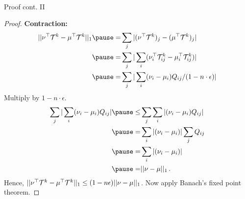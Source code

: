     \begin{frame}{Proof cont. II}
        \begin{proof}
    \textbf{Contraction:}
    \begin{equation}
        \begin{aligned}
            \norm{\nu^{\top} \mathcal{T}^k - \mu^{\top} \mathcal{T}^k}_1 
            \pause = &  \sum_j \abs{(\nu^\top \mathcal{T}^k)_j - (\mu^\top \mathcal{T}^k)_j} \\
            \pause = & \sum_j \abs{\sum_i (\nu^\top_i \mathcal{T}^k_{ij} - \mu^\top_i \mathcal{T}^k_{ij})} \\
            \pause = & \sum_j \abs{\sum_i(\nu_i - \mu_i) Q_{ij}/(1-n\cdot \epsilon)} 
       \end{aligned}
    \end{equation}
    \pause
    Multiply by $1-n\cdot\epsilon$.
    \begin{equation}
        \begin{aligned}
        \sum_j \abs{\sum_i(\nu_i - \mu_i) Q_{ij}} 
        \pause \leq & \sum_j \sum_i\abs{(\nu_i - \mu_i) Q_{ij}} \\
        \pause = & \sum_i \abs{(\nu_i - \mu_i)} \sum_j Q_{ij} \\
        \pause = & \sum_i \abs{(\nu_i - \mu_i)} \\
        \pause = & \norm{\nu - \mu}_1\,.
        \end{aligned}
    \end{equation}
    \pause Hence, $||\nu^{\top} \mathcal{T}^k - \mu^{\top} \mathcal{T}^k||_1 \leq (1-n\epsilon) ||\nu - \mu||_1$.
    \pause Now apply Banach's fixed point theorem.
    \end{proof}
\end{frame}

